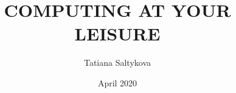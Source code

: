 \documentclass[a4paper,12pt]{book}
\begin{document}
\author{Tatiana Saltykova}
\title{COMPUTING AT YOUR LEISURE}
\date{April 2020}

\frontmatter
\maketitle
\tableofcontents

\mainmatter












\backmatter


\end{document}

